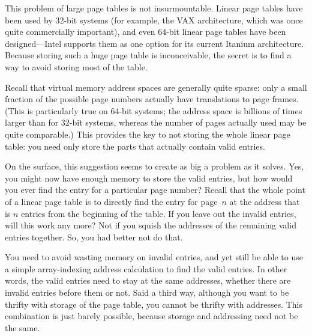 This problem of large page tables is not insurmountable.  Linear page
tables have been used by 32-bit systems (for example, the VAX
architecture, which was once quite commercially important), and even
64-bit linear page tables have been designed---Intel supports them as
one option for its current Itanium architecture.  Because storing such a
huge page table is inconceivable, the secret is to find a way to avoid
storing most of the table.

Recall that virtual memory address spaces are generally quite sparse:
only a small fraction of the possible page numbers actually have
translations to page frames.  (This is particularly true on 64-bit
systems; the address space is billions of times larger than for 32-bit
systems, whereas the number of pages actually used may be quite
comparable.)  This provides the key to not storing the whole linear
page table: you need only store the parts that actually contain valid
entries.

On the surface, this suggestion seems to create as big a problem as it
solves.  Yes, you might now have enough memory to store the valid
entries, but how would you ever find the entry for a particular page
number?  Recall that the whole point of a linear page table is to
directly find the entry for page~$n$ at the address that is
$n$ entries from the beginning of the table. If you leave out the
invalid entries, will this work any more?  Not if you squish the
addresses of the remaining valid entries together.  So, you had better
not do that.

You need to avoid wasting memory on invalid entries, and yet still be
able to use a simple array-indexing address calculation to find the
valid entries.  In other words, the valid entries need to stay at the
same addresses, whether there are invalid entries before them or not.
Said a third way, although you want to be thrifty with storage of the
page table, you cannot be thrifty with addresses.  This combination is just barely
possible, because storage and addressing need not be the same.

